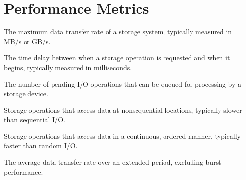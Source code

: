 \documentclass[letterpaper,10pt,english]{sphinxmanual}
\begin{document}
\chapter{Performance Metrics}
\label{\detokenize{glossary:performance-metrics}}\begin{description}
\sphinxAtStartPar
The maximum data transfer rate of a storage system, typically measured in MB/s or GB/s.

\sphinxAtStartPar
The time delay between when a storage operation is requested and when it begins, typically measured in milliseconds.

\sphinxAtStartPar
The number of pending I/O operations that can be queued for processing by a storage device.

\sphinxAtStartPar
Storage operations that access data at non\sphinxhyphen{}sequential locations, typically slower than sequential I/O.

\sphinxAtStartPar
Storage operations that access data in a continuous, ordered manner, typically faster than random I/O.

\sphinxAtStartPar
The average data transfer rate over an extended period, excluding burst performance.

\end{description}
\end{document}
